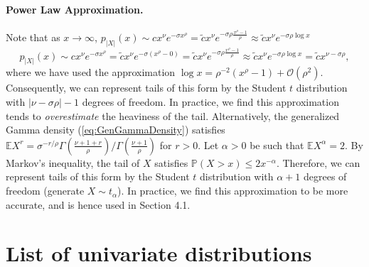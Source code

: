 \documentclass{article}
\theoremstyle{definition}
\begin{document}
\paragraph{Power Law Approximation.} Note that as $x \to \infty$, $p_{|X|}(x) \sim c x^\nu e^{-\sigma x^\rho} = \tilde{c}x^\nu e^{-\sigma\rho\frac{x^\rho - 1}{\rho}} \approx \tilde{c} x^\nu e^{-\sigma\rho \log x}$
    \[
    p_{|X|}(x) \sim c x^\nu e^{-\sigma x^\rho} = \tilde{c} x^\nu e^{-\sigma(x^\rho - 0)} = \tilde{c} x^\nu e^{-\sigma\rho\frac{x^\rho - 1}{\rho}} \approx \tilde{c} x^\nu e^{-\sigma\rho \log x} = \tilde{c} x^{\nu-\sigma \rho},
    \]
    where we have used the approximation $\log x = \rho^{-2}(x^\rho - 1) + \mathcal{O}(\rho^2)$. Consequently, we can represent tails of this form by the Student $t$ distribution with $|\nu-\sigma\rho|-1$ degrees of freedom. In practice, we find this approximation tends to \emph{overestimate} the heaviness of the tail. Alternatively, the generalized Gamma density (\ref{eq:GenGammaDensity}) satisfies $\mathbb{E}X^r = \sigma^{-r/\rho} \Gamma(\frac{\nu+1+r}{\rho})/\Gamma(\frac{\nu+1}{\rho})$ for $r > 0$. Let $\alpha > 0$ be such that $\mathbb{E}X^\alpha = 2$. By Markov's inequality, the tail of $X$ satisfies $\mathbb{P}(X>x)\leq 2 x^{-\alpha}$. Therefore, we can represent tails of this form by the Student $t$ distribution with $\alpha+1$ degrees of freedom (generate $X \sim t_{\alpha}$). In practice, we find this approximation to be more accurate, and is hence used in Section 4.1.

\section{List of univariate distributions}
\end{document}

